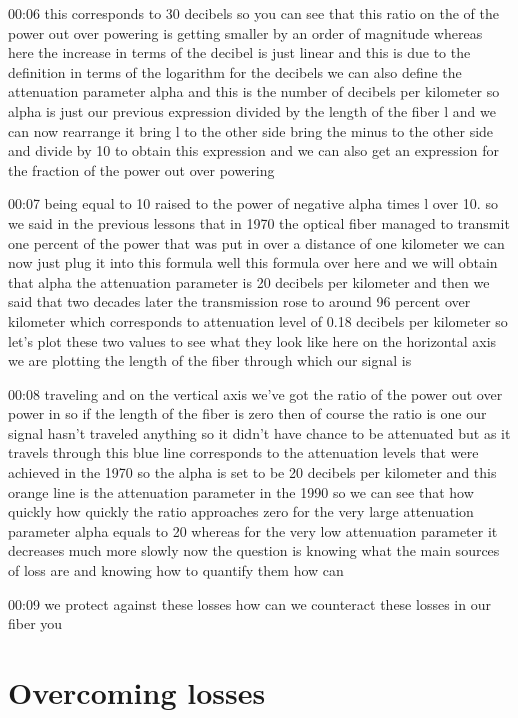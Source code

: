 00:06
this corresponds to 30 decibels so you can see that this ratio
on the of the power out over powering is getting smaller by an order of
magnitude whereas here the increase in terms of the decibel is just linear
and this is due to the definition in terms of the logarithm for the decibels
we can also define the attenuation parameter alpha
and this is the number of decibels per kilometer
so alpha is just our previous expression divided by the length of the fiber
l and we can now rearrange it bring l to the other side bring the minus to
the other side and divide by 10 to obtain this expression and we can also
get an expression for the fraction of the power out over powering

00:07
being equal to 10 raised to the power of negative alpha times l over 10.
so we said in the previous lessons that in 1970
the optical fiber managed to transmit one percent of the power that was put in
over a distance of one kilometer we can now just plug it into this formula
well this formula over here and we will obtain that
alpha the attenuation parameter is 20 decibels
per kilometer and then we said that two decades later the transmission rose
to around 96 percent over kilometer which corresponds to attenuation level
of 0.18 decibels per kilometer so let's plot these two values to see
what they look like here on the horizontal axis we are
plotting the length of the fiber through which our signal is

00:08
traveling and on the vertical axis we've got the ratio of the power out over
power in so if the length of the fiber is zero then of course
the ratio is one our signal hasn't traveled anything so it didn't have
chance to be attenuated but as it travels through this blue line
corresponds to the attenuation levels that were achieved in the 1970
so the alpha is set to be 20 decibels per kilometer and this orange line is the
attenuation parameter in the 1990 so we can see that how quickly how quickly the
ratio approaches zero for the very large attenuation
parameter alpha equals to 20 whereas for the very low attenuation parameter
it decreases much more slowly now the question is knowing what the
main sources of loss are and knowing how to quantify them how can

00:09
we protect against these losses how can we counteract these losses in our fiber
you

\section{Overcoming losses}

